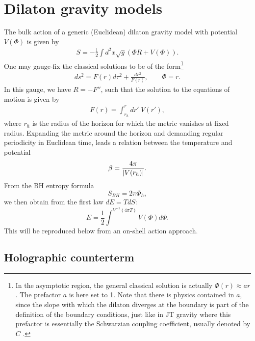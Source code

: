 \documentclass[a4paper,titlepage,12pt]{article}
\numberwithin{equation}{section}
\begin{document}
\section{Dilaton gravity models}
\label{app:dil}
The bulk action of a generic (Euclidean) dilaton gravity model with potential $V(\Phi)$ is given by
\begin{align}
    S=-\frac{1}{2}\int d^2x \sqrt{g}\left(\Phi R+V(\Phi)\right).
\end{align} 
One may gauge-fix the classical solutions to be of the form\footnote{In the asymptotic region, the general classical solution is actually $\Phi(r) \approx a r$. The prefactor $a$ is here set to 1. Note that there is physics contained in $a$, since the slope with which the dilaton diverges at the boundary is part of the definition of the boundary conditions, just like in JT gravity where this prefactor is essentially the Schwarzian coupling coefficient, usually denoted by $C$ \cite{Mertens:2022irh}.} 
\begin{align}
    ds^2=F(r) d\tau^2 +\frac{dr^2}{F(r)}, \qquad \Phi=r.
\end{align}
In this gauge, we have $R=-F''$, such that the solution to the equations of motion is given by 
\begin{align}
    F(r)=\int_{r_h}^r dr'\; V(r'),
\end{align}
where $r_h$ is the radius of the horizon for which the metric vanishes at fixed radius. Expanding the metric around the horizon and demanding regular periodicity in Euclidean time, leads a relation between the temperature and potential 
\begin{align}\label{eq:temp}
    \beta = \frac{4\pi }{\abs{V(r_h)}}.
\end{align}
From the BH entropy formula 
\begin{equation}
S_{BH} = 2\pi \Phi_h,
\end{equation}
we then obtain from the first law $dE=TdS$:
\begin{equation}
E = \frac{1}{2}\int^{V^{-1}(4\pi T)}V(\Phi)d\Phi.
\end{equation}
This will be reproduced below from an on-shell action approach.

\subsection{Holographic counterterm}
\label{a:counter}
\end{document}
